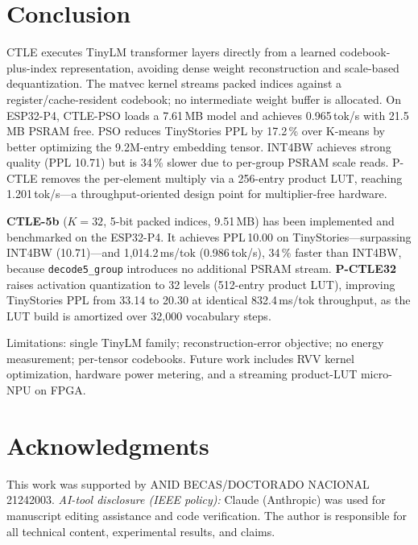 \documentclass[10pt,journal]{IEEEtran}
\begin{document}
\section{Conclusion}

CTLE executes TinyLM transformer layers directly from a learned
codebook-plus-index representation, avoiding dense weight reconstruction and
scale-based dequantization. The matvec kernel streams packed indices against a
register/cache-resident codebook; no intermediate weight buffer is allocated.
On ESP32-P4, CTLE-PSO loads a 7.61\,MB model and achieves 0.965\,tok/s with
21.5\,MB PSRAM free. PSO reduces TinyStories PPL by 17.2\,\% over K-means
by better optimizing the 9.2M-entry embedding tensor. INT4BW achieves strong
quality (PPL 10.71) but is 34\,\% slower due to per-group PSRAM scale reads.
P-CTLE removes the per-element multiply via a 256-entry product LUT, reaching
1.201\,tok/s---a throughput-oriented design point for multiplier-free hardware.

\textbf{CTLE-5b} ($K\!=\!32$, 5-bit packed indices, 9.51\,MB) has been
implemented and benchmarked on the ESP32-P4. It achieves PPL\,10.00 on
TinyStories---surpassing INT4BW (10.71)---and 1{,}014.2\,ms/tok (0.986\,tok/s),
34\,\% faster than INT4BW, because \texttt{decode5\_group} introduces no
additional PSRAM stream. \textbf{P-CTLE32} raises activation quantization to
32 levels (512-entry product LUT), improving TinyStories PPL from 33.14 to
20.30 at identical 832.4\,ms/tok throughput, as the LUT build is amortized
over 32{,}000 vocabulary steps.

Limitations: single TinyLM family; reconstruction-error objective; no energy
measurement; per-tensor codebooks. Future work includes RVV kernel optimization,
hardware power metering, and a streaming product-LUT micro-NPU on FPGA.


\section*{Acknowledgments}
This work was supported by ANID BECAS/DOCTORADO NACIONAL 21242003.
\textit{AI-tool disclosure (IEEE policy):} Claude (Anthropic) was used for
manuscript editing assistance and code verification. The author is responsible
for all technical content, experimental results, and claims.
\end{document}
